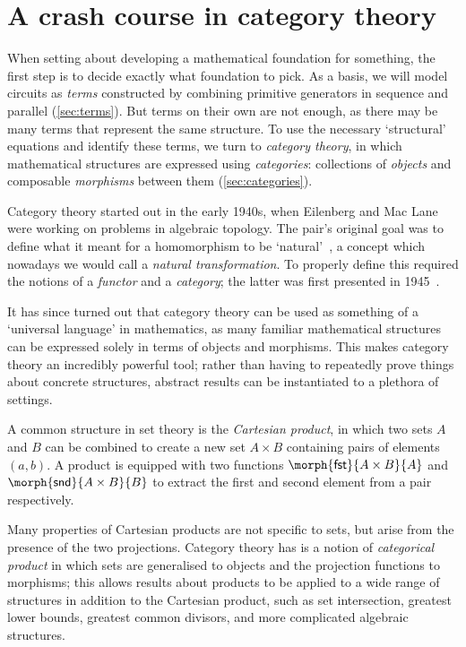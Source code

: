 \chapter{A crash course in category theory}

When setting about developing a mathematical foundation for something,
the first step is to decide exactly what foundation to pick.
As a basis, we will model circuits as \emph{terms} constructed by combining
primitive generators in sequence and parallel (\cref{sec:terms}).
But terms on their own are not enough, as there may be many terms that represent
the same structure.
To use the necessary `structural' equations and identify these terms, we turn
to \emph{category theory}, in which mathematical structures are expressed using
\emph{categories}: collections of \emph{objects} and composable \emph{morphisms}
between them (\cref{sec:categories}).

Category theory started out in the early 1940s, when Eilenberg and Mac Lane
were working on problems in algebraic topology.
The pair's original goal was to define what it meant for a homomorphism to be
`natural'~\cite{eilenberg1942natural}, a concept which nowadays we would call a
\emph{natural transformation}.
To properly define this required the notions of a \emph{functor}
and a \emph{category}; the latter was first presented in
1945~\cite{eilenberg1945general}.

It has since turned out that category theory can be used as something of a
`universal language' in mathematics, as many familiar mathematical structures
can be expressed solely in terms of objects and morphisms.
This makes category theory an incredibly powerful tool; rather than having to
repeatedly prove things about concrete structures, abstract results can be
instantiated to a plethora of settings.

\begin{example}
    A common structure in set theory is the \emph{Cartesian product}, in
    which two sets \(A\) and \(B\) can be combined to create a new set
    \(A \times B\) containing pairs of elements \((a,b)\).
    A product is equipped with two functions
    \(\morph{\mathsf{fst}}{A \times B}{A}\) and
    \(\morph{\mathsf{snd}}{A \times B}{B}\) to extract the first and second
    element from a pair respectively.

    Many properties of Cartesian products are not specific to sets,
    but arise from the presence of the two projections.
    Category theory has is a notion of \emph{categorical product} in which
    sets are generalised to objects and the projection functions to morphisms;
    this allows results about products to be applied to a wide range of
    structures in addition to the Cartesian product, such as set intersection,
    greatest lower bounds, greatest common divisors, and more complicated
    algebraic structures.
\end{example}

